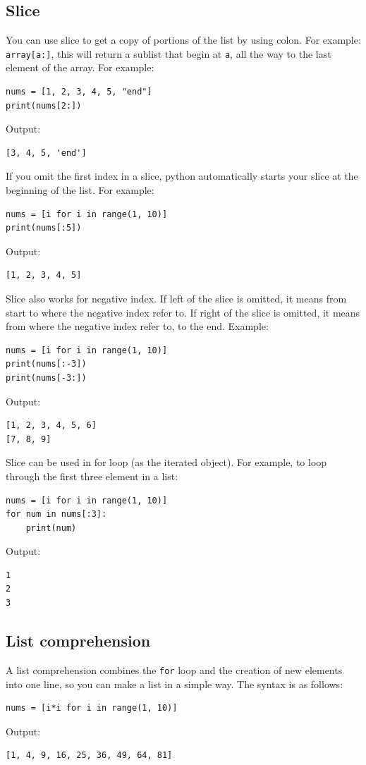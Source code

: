 \documentclass[12pt]{book}
\begin{document}
\subsection{Slice}
\label{sec:orge7b04c6}
You can use slice to get a copy of portions of the list by using colon. For example: \texttt{array[a:]}, this will return a sublist that begin at \texttt{a}, all the way to the last element of the array. For example:
\begin{verbatim}
nums = [1, 2, 3, 4, 5, "end"]
print(nums[2:])
\end{verbatim}
Output:
\begin{verbatim}
[3, 4, 5, 'end']
\end{verbatim}

If you omit the first index in a slice, python automatically starts your slice at the beginning of the list. For example:
\begin{verbatim}
nums = [i for i in range(1, 10)]
print(nums[:5])
\end{verbatim}
Output:
\begin{verbatim}
[1, 2, 3, 4, 5]
\end{verbatim}

Slice also works for negative index. If left of the slice is omitted, it means from start to where the negative index refer to. If right of the slice is omitted, it means from where the negative index refer to, to the end. Example:
\begin{verbatim}
nums = [i for i in range(1, 10)]
print(nums[:-3])
print(nums[-3:])
\end{verbatim}
Output:
\begin{verbatim}
[1, 2, 3, 4, 5, 6]
[7, 8, 9]
\end{verbatim}

Slice can be used in for loop (as the iterated object). For example, to loop through the first three element in a list:
\begin{verbatim}
nums = [i for i in range(1, 10)]
for num in nums[:3]:
    print(num)
\end{verbatim}
Output:
\begin{verbatim}
1
2
3
\end{verbatim}

\subsection{List comprehension \label{org3b2d900}}
\label{sec:orgc75dd05}
A list comprehension combines the \texttt{for} loop and the creation of new elements into one line, so you can make a list in a simple way. The syntax is as follows:
\begin{verbatim}
nums = [i*i for i in range(1, 10)]
\end{verbatim}
Output:
\begin{verbatim}
[1, 4, 9, 16, 25, 36, 49, 64, 81]
\end{verbatim}
\end{document}
